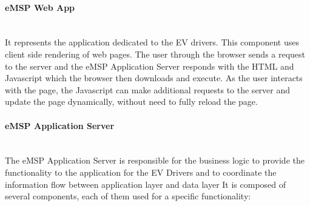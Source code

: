 \paragraph*{eMSP Web App} \hfill \\
It represents the application dedicated to the EV drivers. This component uses client side rendering of web pages. 
The user through the browser sends a request to the server and the eMSP Application Server responds with the HTML and Javascript which the browser then
downloads and execute. As the user interacts with the page, the Javascript can make additional requests to the server and update
the page dynamically, without need to fully reload the page. 
\paragraph*{eMSP Application Server} \hfill \\
The eMSP Application Server is responsible for the business logic to provide the functionality to the application for the EV Drivers and to coordinate the information flow between application layer and data layer
It is composed of several components, each of them used for a specific functionality:\\
